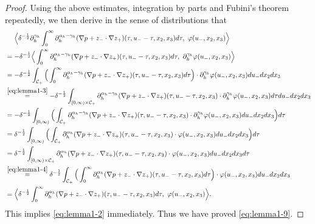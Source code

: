 \documentclass[10pt,reqno]{amsart}
\numberwithin{equation}{section}
\begin{document}
\begin{proof}
  
Using the above estimates, integration by parts and Fubini's theorem repeatedly, we then derive in the sense of distributions that 
	\begin{align*}
	&\ \ \ \  \Big\langle \delta^{-\frac{1}{2}}\partial_{h}^{\gamma_h}\int_0^{\infty}\partial_h^{\alpha_h-\gamma_h}(\nabla p+z_{-}\cdot\nabla z_{+}) 
		(\tau,u_--\tau,x_2,x_3)d\tau,\ \varphi(u_-,x_2,x_3)\Big\rangle\\
		&=-\delta^{-\frac{1}{2}}\Big\langle\int_0^{\infty}\partial_h^{\alpha_h-\gamma_h}(\nabla p+z_{-}\cdot\nabla z_{+}) 
		(\tau,u_--\tau,x_2,x_3)d\tau,\  \partial_{h}^{\gamma_h} \varphi(u_-,x_2,x_3)\Big\rangle\\
		&=-\delta^{-\frac{1}{2}}\int_{\mathcal{C}_+}\Big(\int_0^{\infty}\partial_h^{\alpha_h-\gamma_h}(\nabla p+z_{-}\cdot\nabla z_{+}) 
		(\tau,u_--\tau,x_2,x_3)d\tau\Big)\cdot \partial_{h}^{\gamma_h}\varphi(u_-,x_2,x_3)du_-dx_2dx_3\\
		&\stackrel{ 
		\eqref{eq:lemma1-3}}{=}-\delta^{-\frac{1}{2}}\int_{[0,\infty) \times \mathcal{C}_+}\partial_h^{\alpha_h-\gamma_h}(\nabla p+z_{-}\cdot\nabla z_{+}) (\tau,u_--\tau,x_2,x_3)\cdot \partial_{h}^{\gamma_h}\varphi(u_-,x_2,x_3)d\tau du_-dx_2dx_3\\
		&=-\delta^{-\frac{1}{2}}\int_{[0,\infty)} \Big(\int_{\mathcal{C}_+}\partial_h^{\alpha_h-\gamma_h}(\nabla p+z_{-}\cdot\nabla z_{+}) (\tau,u_--\tau,x_2,x_3)\cdot \partial_{h}^{\gamma_h}\varphi(u_-,x_2,x_3)du_-dx_2dx_3\Big)d\tau \\
		&=\delta^{-\frac{1}{2}}\int_{[0,\infty)} \Big(\int_{\mathcal{C}_+}\partial_h^{\alpha_h}(\nabla p+z_{-}\cdot\nabla z_{+}) (\tau,u_--\tau,x_2,x_3)\cdot \varphi(u_-,x_2,x_3)du_-dx_2dx_3\Big)d\tau \\
		&=\delta^{-\frac{1}{2}}\int_{[0,\infty)\times \mathcal{C}_+}\partial_h^{\alpha_h}(\nabla p+z_{-}\cdot\nabla z_{+}) (\tau,u_--\tau,x_2,x_3)\cdot \varphi(u_-,x_2,x_3)du_-dx_2dx_3d\tau\\
		&\stackrel{ 
		\eqref{eq:lemma1-4}}{=}\delta^{-\frac{1}{2}}\int_{\mathcal{C}_+}\Big(\int_{0}^{\infty} \partial_h^{\alpha_h}(\nabla p+z_{-}\cdot\nabla z_{+})(\tau,u_--\tau,x_2,x_3)d\tau\Big)\cdot \varphi(u_-,x_2,x_3)du_-dx_2dx_3\\
		&=\Big\langle\delta^{-\frac{1}{2}}\int_0^{\infty}  \partial_h^{\alpha_h}(\nabla p+z_{-}\cdot\nabla z_{+})(\tau,u_--\tau,x_2,x_3)d\tau,\ \varphi(u_-,x_2,x_3)\Big\rangle.
	\end{align*}
This implies \eqref{eq:lemma1-2} immediately. Thus we have proved \eqref{eq:lemma1-9}. 


\end{proof}
\end{document}
